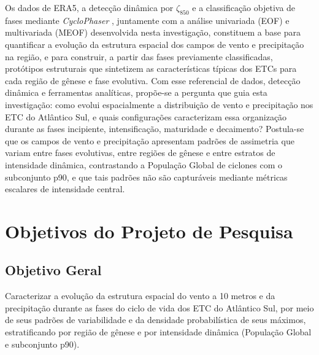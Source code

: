 Os dados de ERA5, a detecção dinâmica por $\zeta_{850}$ \citep{gramcianinov2020analysis} e a classificação objetiva de fases mediante \textit{CycloPhaser} \citep{coutodesouza2024new, deSouza2025CycloPhaser}, juntamente com a análise univariada (EOF) e multivariada (MEOF) desenvolvida nesta investigação, constituem a base para quantificar a evolução da estrutura espacial dos campos de vento e precipitação na região, e para construir, a partir das fases previamente classificadas, protótipos estruturais que sintetizem as características típicas dos ETCs para cada região de gênese e fase evolutiva.
Com esse referencial de dados, detecção dinâmica e ferramentas analíticas, propõe-se a pergunta que guia esta investigação: como evolui espacialmente a distribuição de vento e precipitação nos ETC do Atlântico Sul, e quais configurações caracterizam essa organização durante as fases incipiente, intensificação, maturidade e decaimento?
Postula-se que os campos de vento e precipitação apresentam padrões de assimetria que variam entre fases evolutivas, entre regiões de gênese e entre estratos de intensidade dinâmica, contrastando a População Global de ciclones com o subconjunto p90, e que tais padrões não são capturáveis mediante métricas escalares de intensidade central.

\section{Objetivos do Projeto de Pesquisa}

\subsection{Objetivo Geral}
Caracterizar a evolução da estrutura espacial do vento a 10 metros e da precipitação durante as fases do ciclo de vida dos ETC do Atlântico Sul, por meio de seus padrões de variabilidade e da densidade probabilística de seus máximos, estratificando por região de gênese e por intensidade dinâmica (População Global e subconjunto p90).

